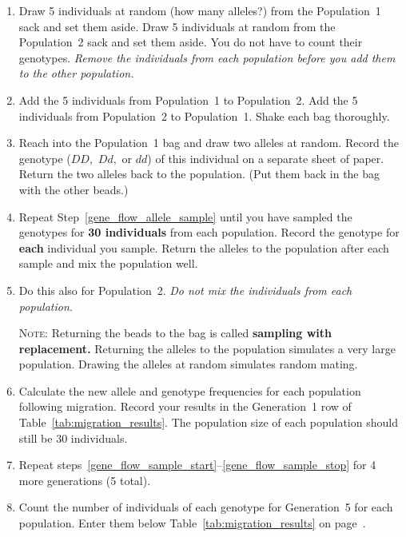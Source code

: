 \documentclass[12pt, hidelinks]{exam}
\newcommand{\allele}[1]{$#1$}
\begin{document}
\begin{questions}
\begin{enumerate}
	\item \label{gene_flow_sample_start}Draw 5 individuals at random (how many alleles?) from the Population~1 sack and set them aside. Draw 5 individuals at random from the Population~2 sack and set them aside. You do not have to count their genotypes. \emph{Remove the individuals from each population before you add them to the other population.}
	
	\item Add the 5 individuals from Population~1 to Population~2. Add the 5 individuals from Population~2 to Population~1. Shake each bag thoroughly.
	
	\item \label{gene_flow_allele_sample} Reach into the Population~1 bag and draw two alleles at random. Record the genotype (\allele{DD,} \allele{Dd,} or \allele{dd}) of this individual on a separate sheet of paper. Return the two alleles back to the population. (Put them back in the bag with the other beads.)
	
	\item Repeat Step~\ref{gene_flow_allele_sample} until you have sampled the genotypes for \textbf{30 individuals} from each population. Record the genotype for \textbf{each} individual you sample. Return the alleles to the population after each sample and mix the population well. 

	\item Do this also for Population~2.
	\emph{Do not mix the individuals from each population.}
	
	\textsc{Note:} Returning the beads to the bag is called \textbf{sampling with replacement.} Returning the alleles to the population simulates a very large population. Drawing the alleles at random simulates random mating.
	
	\item \label{gene_flow_sample_stop} Calculate the new allele and genotype frequencies for each population following migration. Record your results in the Generation~1 row of Table~\ref{tab:migration_results}. The population size of each population should still be 30 individuals.
	
	\item Repeat steps~\ref{gene_flow_sample_start}–\ref{gene_flow_sample_stop} for 4 more generations (5 total).%
	
	\item Count the number of individuals of each genotype for Generation~5 for each population. Enter them below Table~\ref{tab:migration_results} on page~\pageref{tab:migration_results}. 


\end{enumerate}
\end{questions}
\end{document}
